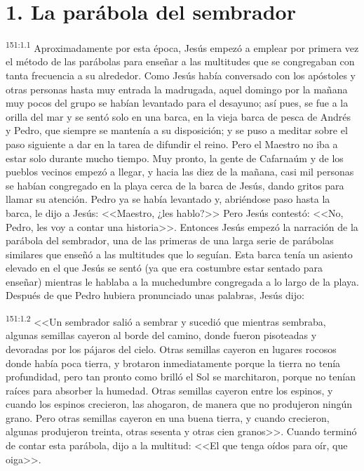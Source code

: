 \section*{1. La parábola del sembrador}
\par 
\textsuperscript{151:1.1} Aproximadamente por esta época, Jesús empezó a emplear por primera vez el método de las parábolas para enseñar a las multitudes que se congregaban con tanta frecuencia a su alrededor. Como Jesús había conversado con los apóstoles y otras personas hasta muy entrada la madrugada, aquel domingo por la mañana muy pocos del grupo se habían levantado para el desayuno; así pues, se fue a la orilla del mar y se sentó solo en una barca, en la vieja barca de pesca de Andrés y Pedro, que siempre se mantenía a su disposición; y se puso a meditar sobre el paso siguiente a dar en la tarea de difundir el reino. Pero el Maestro no iba a estar solo durante mucho tiempo. Muy pronto, la gente de Cafarnaúm y de los pueblos vecinos empezó a llegar, y hacia las diez de la mañana, casi mil personas se habían congregado en la playa cerca de la barca de Jesús, dando gritos para llamar su atención. Pedro ya se había levantado y, abriéndose paso hasta la barca, le dijo a Jesús: <<Maestro, ¿les hablo?>> Pero Jesús contestó: <<No, Pedro, les voy a contar una historia>>. Entonces Jesús empezó la narración de la parábola del sembrador, una de las primeras de una larga serie de parábolas similares que enseñó a las multitudes que lo seguían. Esta barca tenía un asiento elevado en el que Jesús se sentó (ya que era costumbre estar sentado para enseñar) mientras le hablaba a la muchedumbre congregada a lo largo de la playa. Después de que Pedro hubiera pronunciado unas palabras, Jesús dijo:

\par 
\textsuperscript{151:1.2} <<Un sembrador salió a sembrar y sucedió que mientras sembraba, algunas semillas cayeron al borde del camino, donde fueron pisoteadas y devoradas por los pájaros del cielo. Otras semillas cayeron en lugares rocosos donde había poca tierra, y brotaron inmediatamente porque la tierra no tenía profundidad, pero tan pronto como brilló el Sol se marchitaron, porque no tenían raíces para absorber la humedad. Otras semillas cayeron entre los espinos, y cuando los espinos crecieron, las ahogaron, de manera que no produjeron ningún grano. Pero otras semillas cayeron en una buena tierra, y cuando crecieron, algunas produjeron treinta, otras sesenta y otras cien granos>>. Cuando terminó de contar esta parábola, dijo a la multitud: <<El que tenga oídos para oír, que oiga>>.

